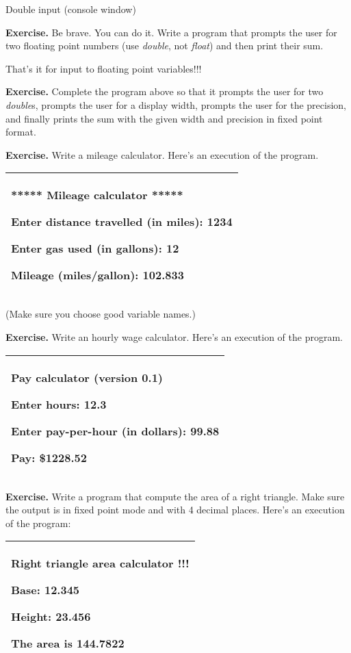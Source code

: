 \documentclass[
]{article}
\begin{document}
Double input (console window)

\textbf{Exercise.} Be brave. You can do it. Write a program that prompts
the user for two floating point numbers (use \emph{double}, not
\emph{float}) and then print their sum.

That's it for input to floating point variables!!!

\textbf{Exercise.} Complete the program above so that it prompts the
user for two \emph{double}s, prompts the user for a display width,
prompts the user for the precision, and finally prints the sum with the
given width and precision in fixed point format.

\textbf{Exercise.} Write a mileage calculator. Here's an execution of
the program.

\begin{longtable}[]{@{}l@{}}
\toprule
\endhead
\begin{minipage}[t]{0.97\columnwidth}\raggedright
***** Mileage calculator *****

Enter distance travelled (in miles): \textbf{1234}

Enter gas used (in gallons): \textbf{12}

Mileage (miles/gallon): 102.833\strut
\end{minipage}\tabularnewline
\bottomrule
\end{longtable}

(Make sure you choose good variable names.)

\textbf{Exercise.} Write an hourly wage calculator. Here's an execution
of the program.

\begin{longtable}[]{@{}l@{}}
\toprule
\endhead
\begin{minipage}[t]{0.97\columnwidth}\raggedright
Pay calculator (version 0.1)

Enter hours: \textbf{12.3}

Enter pay-per-hour (in dollars): \textbf{99.88}

Pay: \$1228.52\strut
\end{minipage}\tabularnewline
\bottomrule
\end{longtable}

\textbf{Exercise.} Write a program that compute the area of a right
triangle. Make sure the output is in fixed point mode and with 4 decimal
places. Here's an execution of the program:

\begin{longtable}[]{@{}l@{}}
\toprule
\endhead
\begin{minipage}[t]{0.97\columnwidth}\raggedright
Right triangle area calculator !!!

Base: \textbf{12.345}

Height: \textbf{23.456}

The area is 144.7822\strut
\end{minipage}\tabularnewline
\bottomrule
\end{longtable}
\end{document}
